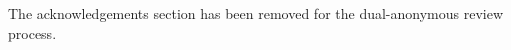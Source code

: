 \documentclass[sigconf]{acmart}
\begin{document}


\author{Author1}

\author{Author2}

\author{Author3}

\begin{abstract}

\end{abstract}



\maketitle


\begin{acks}
The acknowledgements section has been removed for the dual-anonymous review process.
\end{acks}



\end{document}
